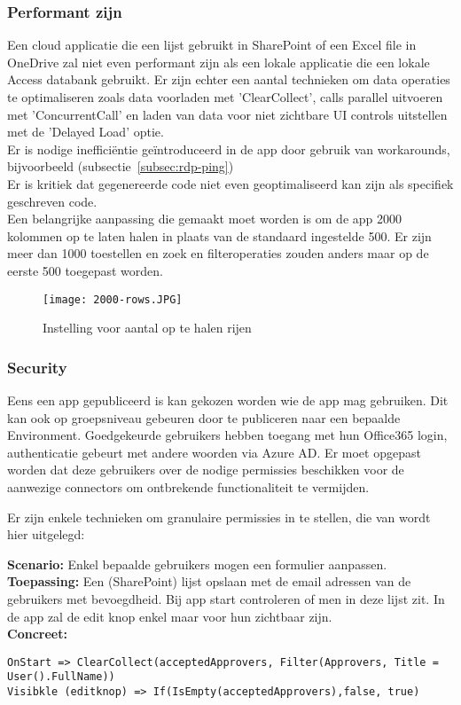 \subsubsection{Performant zijn}

Een cloud applicatie die een lijst gebruikt in SharePoint of een Excel file in OneDrive zal niet even performant zijn als een lokale applicatie die een lokale Access databank gebruikt. Er zijn echter een aantal technieken om data operaties te optimaliseren zoals data voorladen met 'ClearCollect', calls parallel uitvoeren met 'ConcurrentCall' en laden van data voor niet zichtbare UI controls uitstellen met de 'Delayed Load' optie. \autocite{Andaloussi2018}\\
Er is nodige inefficiëntie geïntroduceerd in de app door gebruik van workarounds, bijvoorbeeld (subsectie~\ref{subsec:rdp-ping})\\
Er is kritiek dat gegenereerde code niet even geoptimaliseerd kan zijn als specifiek geschreven code. \autocite{Shiah2018}\\
Een belangrijke aanpassing die gemaakt moet worden is om de app 2000 kolommen op te laten halen in plaats van de standaard ingestelde 500. Er zijn meer dan 1000 toestellen en zoek en filteroperaties zouden anders maar op de eerste 500 toegepast worden.

\begin{figure}[h!]
    \texttt{[image: 2000-rows.JPG]}
    \caption{Instelling voor aantal op te halen rijen}
    \label{fig:2000-rows}
\end{figure}

\subsubsection{Security}

Eens een app gepubliceerd is kan gekozen worden wie de app mag gebruiken. Dit kan ook op groepsniveau gebeuren door te publiceren naar een bepaalde Environment. Goedgekeurde gebruikers hebben toegang met hun Office365 login, authenticatie gebeurt met andere woorden via Azure AD. Er moet opgepast worden dat deze gebruikers over de nodige permissies beschikken voor de aanwezige connectors om ontbrekende functionaliteit te vermijden.

Er zijn enkele technieken om granulaire permissies in te stellen, die van \textcite{Dunnam2019} wordt hier uitgelegd:

\textbf{Scenario:} Enkel bepaalde gebruikers mogen een formulier aanpassen.\\
\textbf{Toepassing:} Een (SharePoint) lijst opslaan met de email adressen van de gebruikers met bevoegdheid. Bij app start controleren of men in deze lijst zit. In de app zal de edit knop enkel maar voor hun zichtbaar zijn.\\
\textbf{Concreet:} 
\begin{lstlisting}
OnStart => ClearCollect(acceptedApprovers, Filter(Approvers, Title = User().FullName))
Visibkle (editknop) => If(IsEmpty(acceptedApprovers),false, true)
\end{lstlisting} 

